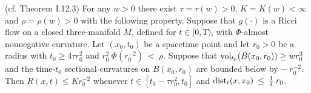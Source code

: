 \begin{theorem}
  \label{thm:kl-earlier-scalar-curvature-bounds-smaller-balls-from-lower-curvature-bound-estimates-scalar-curvature}
 (cf. Theorem I.12.3) \label{thmI.12.3}
For any $w > 0$ there exist $\tau = \tau(w) > 0$, $K = K(w) < \infty$ and
$\rho = \rho(w) > 0$ with the following property.  Suppose that
$g(\cdot)$ is a Ricci flow on a closed three-manifold $M$, defined for
$t \in [0, T)$, with $\Phi$-almost nonnegative curvature. Let $(x_0, t_0)$
be a spacetime point and let $r_0 > 0$ be a radius with $t_0 \ge 4 \tau r_0^2$
and
$r_0^2 \: \Phi(r_0^{-2}) \: < \: \rho$.
Suppose that $\operatorname{vol}_{t_0}(B(x_0,r_0)) \ge w r_0^3$ and
the time-$t_0$ sectional curvatures on $B(x_0, r_0)$ are bounded below by
$- \: r_0^{-2}$. Then $R(x,t) \le K r_0^{-2}$ whenever
$t \in [t_0 - \tau r_0^2, t_0]$ and
$\operatorname{dist}_t(x, x_0) \: \le \: \frac14 \: r_0$.
\end{theorem}
